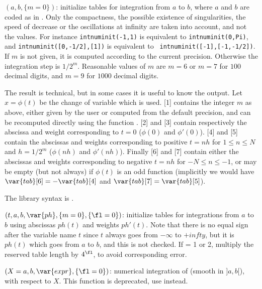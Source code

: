 $(a,b,\{m=0\})$: \label{se:intnuminit}initialize tables for integration from
$a$ to $b$, where $a$ and $b$ are coded as in . Only the
compactness, the possible existence of singularities, the speed of decrease
or the oscillations at infinity are taken into account, and not the values.
For instance {\tt intnuminit(-1,1)} is equivalent to {\tt intnuminit(0,Pi)},
and {\tt intnuminit([0,-1/2],[1])} is equivalent to {\tt
intnuminit([-1],[-1,-1/2])}. If $m$ is not given, it is computed according to
the current precision. Otherwise the integration step is $1/2^m$. Reasonable
values of $m$ are $m=6$ or $m=7$ for $100$ decimal digits, and $m=9$ for
$1000$ decimal digits.

The result is technical, but in some cases it is useful to know the output.
Let $x=\phi(t)$ be the change of variable which is used. [1] contains
the integer $m$ as above, either given by the user or computed from the default
precision, and can be recomputed directly using the function .
[2] and [3] contain respectively the abscissa and weight
corresponding to $t=0$ ($\phi(0)$ and $\phi'(0)$). [4] and
[5] contain the abscissas and weights corresponding to positive
$t=nh$ for $1\le n\le N$ and $h=1/2^m$ ($\phi(nh)$ and $\phi'(nh)$). Finally
[6] and [7] contain either the abscissas and weights
corresponding to negative $t=nh$ for $-N\le n\le -1$, or may be empty (but
not always) if $\phi(t)$ is an odd function (implicitly we would have
$\var{tab}[6]=-\var{tab}[4]$ and $\var{tab}[7]=\var{tab}[5]$).

The library syntax is .

$(t,a,b,\var{ph},\{m=0\},\{\fl=0\})$: \label{se:intnuminitgen}initialize tables for integrations from $a$ to $b$ using abscissas
$ph(t)$ and weights $ph'(t)$. Note that there is no equal sign after the
variable name $t$ since $t$ always goes from $-\infty$ to $+infty$, but it
is $ph(t)$ which goes from $a$ to $b$, and this is not checked. If \fl = 1
or 2, multiply the reserved table length by $4^{\fl}$, to avoid corresponding
error.


$(X=a,b,\var{expr},\{\fl=0\})$: \label{se:intnumromb}numerical integration of
 (smooth in $]a,b[$), with respect to $X$. This function is
deprecated, use  instead.

